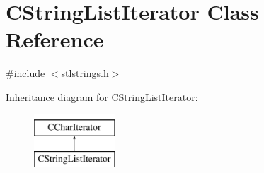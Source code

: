 \hypertarget{classCStringListIterator}{\section{C\-String\-List\-Iterator Class Reference}
\label{classCStringListIterator}
}


{\ttfamily \#include $<$stlstrings.\-h$>$}

Inheritance diagram for C\-String\-List\-Iterator\-:\begin{figure}[H]
\begin{center}
\leavevmode
\includegraphics[height=2.000000cm]{dd/da7/classCStringListIterator}
\end{center}
\end{figure}
